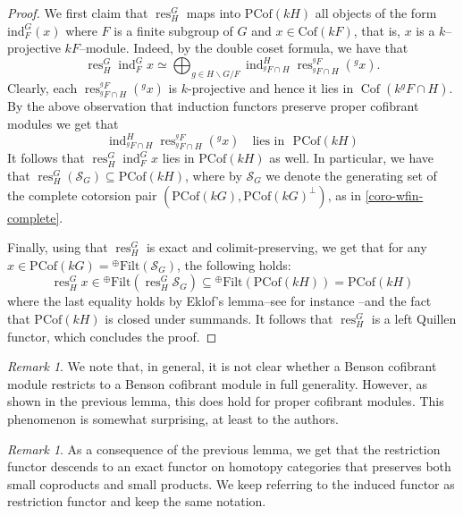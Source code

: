 \documentclass{amsart}
\newcommand{\res}{\operatorname{res}\nolimits}
\newcommand{\ind}{\operatorname{ind}\nolimits}
\def \S{{\mathcal S}}
\def \W{{\mathcal W}}
\DeclareMathOperator{\Cof}{Cof}
\numberwithin{equation}{section}%
\theoremstyle{remark}
\newtheorem{remark}[equation]{Remark}
\begin{document}
{\begin{proof}

   We first claim that $\res^G_H$ maps into $\mathrm{PCof}(kH)$ all objects of the form $\mathrm{ind}_F^G(x)$ where $F$ is a finite subgroup of $G$ and $x\in\mathrm{Cof}(kF)$, that is, $x$ is a $k$--projective $kF$--module. Indeed,
    by the double coset formula, we have that 
    \[
    \res^G_H\ind_F^Gx\simeq \bigoplus_{g\in H\backslash G/F} \ind_{{}^g\!F\cap H}^H \res^{{}^g\!F}_{{}^g\!F\cap H}({}^g\!x).
    \]
    Clearly, each $\res^{{}^g\!F}_{{}^g\!F\cap H}({}^g\!x)$ is $k$-projective and hence it lies in $\Cof(k{}^g\!F\cap H)$. By %
    the above observation that induction functors preserve proper cofibrant modules we get that 
    \[
    \ind_{{}^g\!F\cap H}^H \res^{{}^g\!F}_{{}^g\!F\cap H}({}^g\!x)\quad \mbox{lies in}\,\,\,\,\mathrm{PCof}(kH)
    \]
     It follows that $\res^G_H\ind_F^Gx $ lies in $\mathrm{PCof}(kH)$ as well. In particular, we have that $\res^G_H(\mathcal{S}_G)\subseteq \mathrm{PCof}(kH)$, where by $\mathcal{S}_G$ we denote the generating set of the complete cotorsion pair $(\mathrm{PCof}(kG),\mathrm{PCof}(kG)^{\bot})$, as in \cref{coro-wfin-complete}.

    Finally, using that $\res^G_H$ is exact and colimit-preserving, we get that for any $x \in \mathrm{PCof}(kG)= {}^\oplus\mathrm{Filt}(\S_G)$, the following holds:
    \[
    \res^G_Hx\in {}^\oplus \mathrm{Filt}(\res^G_H\mathcal S_G)\subseteq {}^\oplus \mathrm{Filt}(\mathrm{PCof}(kH))=\mathrm{PCof}(kH)
    \] 
where the last equality holds by Eklof's lemma--see for instance \cite[Lemma~1]{Eklof}--and the fact that $\mathrm{PCof}(kH)$ is closed under summands. It follows that $\res^G_H$ is a left Quillen functor, which  concludes the proof.
\end{proof}

\begin{remark}
   We note that, in general, it is not clear whether a Benson cofibrant module restricts to a Benson cofibrant module in full generality. However, as shown in the previous lemma, this does hold for proper cofibrant modules. This phenomenon is somewhat surprising, at least to the authors.
\end{remark}


\begin{remark}
    As a consequence of the previous lemma, we get that the restriction functor descends to an exact functor on homotopy categories that preserves both small coproducts and small products. We keep referring to the induced functor as restriction functor and keep the same notation. 
\end{remark} 

}
\end{document}
